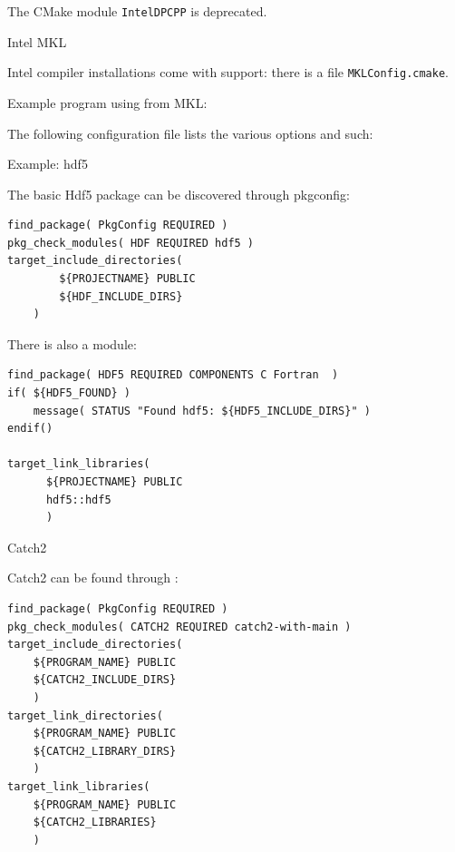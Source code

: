 \begin{remark}
  The CMake module \lstinline{IntelDPCPP} is deprecated.
\end{remark}


 {Intel MKL}


Intel compiler installations come with  support:
there is a file \lstinline[language=shell]{MKLConfig.cmake}.

Example program using  from MKL:


The following configuration file lists the various options and such:
%



 {Example: hdf5}


The basic Hdf5 package can be discovered
through pkgconfig:
%
\begin{lstlisting}
find_package( PkgConfig REQUIRED )
pkg_check_modules( HDF REQUIRED hdf5 )
target_include_directories(
        ${PROJECTNAME} PUBLIC
        ${HDF_INCLUDE_DIRS}
	)
\end{lstlisting}

There is also a module:
\begin{lstlisting}
find_package( HDF5 REQUIRED COMPONENTS C Fortran  )
if( ${HDF5_FOUND} )
    message( STATUS "Found hdf5: ${HDF5_INCLUDE_DIRS}" )
endif()

target_link_libraries(
      ${PROJECTNAME} PUBLIC
      hdf5::hdf5
      )
\end{lstlisting}



 {Catch2}
\label{sec:cmake-catch2}

Catch2 can be found through :
\begin{lstlisting}
find_package( PkgConfig REQUIRED )
pkg_check_modules( CATCH2 REQUIRED catch2-with-main )
target_include_directories(
	${PROGRAM_NAME} PUBLIC
	${CATCH2_INCLUDE_DIRS}
	)
target_link_directories(
	${PROGRAM_NAME} PUBLIC
	${CATCH2_LIBRARY_DIRS}
	)
target_link_libraries(
	${PROGRAM_NAME} PUBLIC
	${CATCH2_LIBRARIES}
	)
\end{lstlisting}

